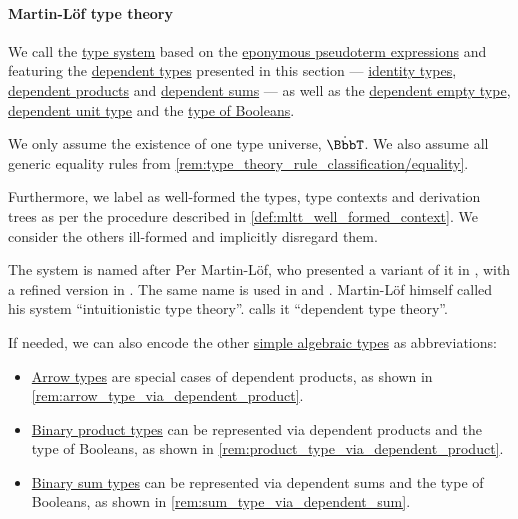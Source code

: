 \paragraph{Martin-L\"of type theory}

\begin{definition}\label{def:mltt}\mimprovised
  We call  the \hyperref[def:abstract_type_system]{type system} based on the \hyperref[def:mltt_pseudoterm]{eponymous pseudoterm expressions} and featuring the \hyperref[con:dependent_type]{dependent types} presented in this section --- \hyperref[def:identity_type]{identity types}, \hyperref[def:dependent_product]{dependent products} and \hyperref[def:dependent_sum]{dependent sums} --- as well as the \hyperref[def:dependent_empty_type]{dependent empty type}, \hyperref[def:dependent_unit_type]{dependent unit type} and the \hyperref[def:type_of_booleans]{type of Booleans}.

  We only assume the existence of one type universe, \( \syn\BbbT \). We also assume all generic equality rules from \cref{rem:type_theory_rule_classification/equality}.

  Furthermore, we label as well-formed the types, type contexts and derivation trees as per the procedure described in \cref{def:mltt_well_formed_context}. We consider the others ill-formed and implicitly disregard them.
\end{definition}
\begin{comments}
  \item The system is named after Per Martin-L\"of, who presented a variant of it in \cite{MartinLöf1975IntuitionisticTypeTheory}, with a refined version in \cite{MartinLöf1984IntuitionisticTypeTheory}. The same name is used in \cite{UnivalentFoundationsProgram2013HoTT} and \cite[ch. 8]{Mimram2020ProgramEqualsProof}. Martin-L\"of himself called his system \enquote{intuitionistic type theory}. \cite[ch. 8]{Mimram2020ProgramEqualsProof} calls it \enquote{dependent type theory}.

  \item If needed, we can also encode the other \hyperref[def:simple_algebraic_types]{simple algebraic types} as abbreviations:
  \begin{itemize}
    \item \hyperref[def:arrow_type]{Arrow types} are special cases of dependent products, as shown in \cref{rem:arrow_type_via_dependent_product}.
    \item \hyperref[def:simple_product_type]{Binary product types} can be represented via dependent products and the type of Booleans, as shown in \cref{rem:product_type_via_dependent_product}.
    \item \hyperref[def:simple_sum_type]{Binary sum types} can be represented via dependent sums and the type of Booleans, as shown in \cref{rem:sum_type_via_dependent_sum}.
  \end{itemize}
\end{comments}

